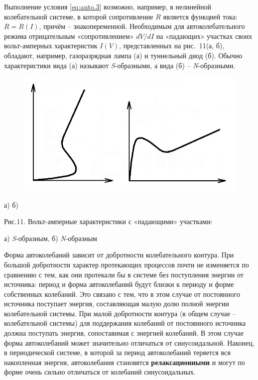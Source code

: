\documentclass[]{article}
\begin{document}
Выполнение условия \ref{eq:auto.3} возможно, например, в {нелинейной}
колебательной системе, в которой сопротивление \(R\) является функцией
тока: \(R=R(I)\), причём -- {знакопеременной}. Необходимым для
автоколебательного режима отрицательным «сопротивлением» \({dV}/{dI}\)
на «падающих» участках своих вольт-амперных характеристик \(I(V)\),
представленных на рис.~11(а, б), обладают, например, газоразрядная лампа
(а) и туннельный диод (б). Обычно характеристики вида (а) называют
\emph{S}-образными, а вида (б) -- \emph{N}-образными.

\begin{figure}
\centering
\includegraphics{Images/media/image16.jpeg}
\caption{}
\end{figure}

а) б)

Рис.11. Вольт-амперные характеристики с «падающими» участками:

а) \emph{S}-образным, б) \emph{N}-образным

Форма автоколебаний зависит от добротности колебательного контура. При
большой добротности характер протекающих процессов почти не изменяется
по сравнению с тем, как они протекали бы в системе без поступления
энергии от источника: период и форма автоколебаний будут близки к
периоду и форме собственных колебаний. Это связано с тем, что в этом
случае от постоянного источника поступает энергия, составляющая малую
долю полной энергии колебательной системы. При малой добротности контура
(в общем случае -- колебательной системы) для поддержания колебаний от
постоянного источника должна поступать энергия, сопоставимая с энергией
колебаний. В этом случае форма автоколебаний может значительно
отличаться от синусоидальной. Наконец, в периодической системе, в
которой за период автоколебаний теряется вся накопленная энергия,
автоколебания становятся \textbf{релаксационными} и могут по форме очень
сильно отличаться от колебаний синусоидальных.
\end{document}

